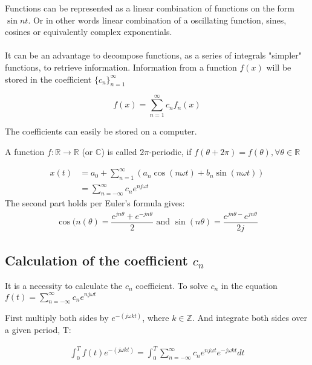  

Functions can be represented as a linear combination of functions on the form $\sin nt$.
Or in other words linear combination of a oscillating function, sines, cosines or equivalently complex exponentials.
\\\\
It can be an advantage to decompose functions, as a series of integrals "simpler" functions, to retrieve information. Information from a function $f(x)$ will be stored in the coefficient $\{c_n\}_{n=1}^\infty$

\begin{equation}
f(x) = \sum_{n=1}^\infty c_n f_n(x)
\end{equation}

The coefficients can easily be stored on a computer.



A function $f: \mathbb{R}\to\mathbb{R}$ (or $\mathbb{C}$) is called $2\pi$-periodic, if $f(\theta + 2\pi) = f(\theta), \forall\theta\in\mathbb{R}$

%
%

\begin{align*}
	x(t) &= a_0 + \sum_{n=1}^\infty(a_n \cos(n \omega t) + b_n \sin(n \omega t))\\
	&= \sum_{n=-\infty}^{\infty} c_n e^{n j\omega t} 
\end{align*}
The second part holds per Euler's formula gives:
\begin{align*}
	\cos(n(\theta) = \dfrac{e^{j n \theta} + e^{-j n \theta}}{2} \text{ and } \sin(n \theta) = \dfrac{e^{jn\theta-}e^{jn\theta}}{2j}
\end{align*}

\subsection{Calculation of the coefficient $c_n$}
It is a necessity to calculate the $c_n$ coefficient.
To solve $c_n$ in the equation $f(t)= \sum_{n=-\infty}^{\infty} c_n e^{n j\omega t}$

First multiply both sides by $e^{-(j\omega k t)}$, where $k\in \mathbb{Z}$. And integrate both sides over a given period, T:

\begin{align*}
	\int_{0}^T f(t)e^{-(j\omega k t)} = \int_{0}^T \sum_{n=-\infty}^{\infty} c_n e^{n j\omega t} e^{-j\omega k t} dt
\end{align*}


%
